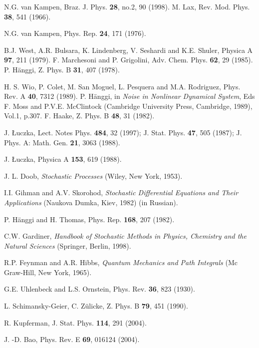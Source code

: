 \documentclass[authoryear,draft,1p,times]{elsarticle}
\renewcommand{\=}{\stackrel{\mathrm{d}}{=}}
\begin{document}
\begin{thebibliography}{99}

 N.G. van Kampen, Braz. J. Phys. {\bf 28}, no.2, 90 (1998).
%
 M. Lax, Rev. Mod. Phys. {\bf 38}, 541 (1966).

%
  N.G. van Kampen,  Phys. Rep. {\bf 24}, 171 (1976).

%
 B.J. West, A.R. Bulsara, K. Lindenberg, 
V. Seshardi and K.E. Shuler,  Physica A {\bf 97}, 211 (1979).
%
F.  Marchesoni and P. Grigolini,  
 Adv. Chem. Phys. {\bf 62}, 29 (1985).
%
%
P. H{\"a}nggi, Z. Phys. B {\bf 31}, 407 (1978).

 H. S. Wio, P. Colet, M. San Moguel, L. Pesquera and M.A. Rodriguez, 
Phys. Rev. A {\bf 40}, 7312 (1989). 
% 
P. H{\"a}nggi,  
in {\it Noise in Nonlinear Dynamical System},
Eds F. Moss and  P.V.E. McClintock 
(Cambridge University Press, Cambridge, 1989), Vol.1, p.307.
%
%
F. Haake,  Z. Phys. B {\bf 48}, 31 (1982). 

%
 J. {\L}uczka,  Lect. Notes  Phys. {\bf 484},  32 (1997);
J. Stat. Phys.  {\bf 47}, 505 (1987);
  J. Phys. A: Math. Gen. {\bf 21},  3063 (1988). 

 J. {\L}uczka,  Physica A {\bf 153}, 619 (1988).

 J. L.  Doob, {\it Stochastic  Processes} (Wiley, New York, 1953).

 I.I. Gihman and A.V. Skorohod, {\it Stochastic Differential 
Equations and Their Applications} (Naukova Dumka, Kiev, 1982) (in Russian). 

 P. H\"anggi and H. Thomas, Phys. Rep. {\bf 168}, 207 (1982).

 C.W. Gardiner, {\it Handbook of Stochastic Methods in Physics, 
Chemistry and the Natural Sciences} (Springer, Berlin, 1998).

 R.P. Feynman and A.R. Hibbs, {\it Quantum Mechanics 
and Path Integrals} (Mc Graw-Hill, New York, 1965). 

 G.E. Uhlenbeck and L.S. Ornstein, Phys. Rev. {\bf 36}, 823 (1930). 

 L. Schimansky-Geier, C. Z\"ulicke,
Z. Phys. B {\bf 79}, 451 (1990). 

 R. Kupferman, J. Stat. Phys. {\bf 114}, 291 (2004).

 J. -D. Bao,  Phys. Rev. E {\bf 69}, 016124 (2004).



\end{thebibliography}
\end{document}
